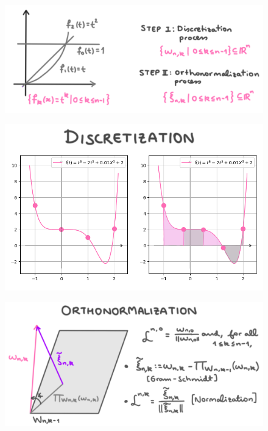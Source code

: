 \documentclass[]{beamer}
\theoremstyle{definition}
\begin{document}
\begin{frame}
\begin{figure}[h]
\includegraphics[scale = 1]{1}
\end{figure}
\end{frame}

\begin{frame}
\begin{figure}[h]
\includegraphics[scale = 1.4]{discretization}
\end{figure}
\end{frame}

\begin{frame}
\begin{figure}[h]
\includegraphics[scale = 1.4]{orthonorm}
\end{figure}
\end{frame}
\end{document}
